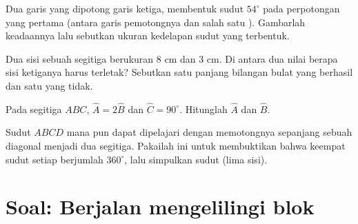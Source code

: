 \begin{exercise}[$\star\star$]\label{exo:g7:triangles:8}
Dua garis yang  dipotong garis ketiga, membentuk sudut $54^\circ$
pada perpotongan yang pertama (antara garis pemotongnya dan salah satu
). Gambarlah keadaannya lalu sebutkan ukuran kedelapan
sudut yang terbentuk.
\end{exercise}

\begin{exercise}[$\star\star$]\label{exo:g7:triangles:9}
Dua sisi sebuah segitiga berukuran $8$ cm dan $3$ cm. Di antara dua
nilai berapa sisi ketiganya harus terletak? Sebutkan satu panjang
bilangan bulat yang berhasil dan satu yang tidak.
\end{exercise}

\begin{exercise}[$\star\star$]\label{exo:g7:triangles:10}
Pada segitiga $ABC$, $\widehat A = 2\widehat B$ dan
$\widehat C = 90^\circ$. Hitunglah $\widehat A$ dan $\widehat B$.
\end{exercise}

\begin{exercise}[$\star\star\star$]\label{exo:g7:triangles:11}
Sudut  $ABCD$ mana pun dapat dipelajari dengan memotongnya
sepanjang sebuah diagonal menjadi dua segitiga. Pakailah ini untuk
membuktikan bahwa keempat sudut setiap  berjumlah
$360^\circ$, lalu simpulkan  sudut  (lima sisi).
\end{exercise}

\section{Soal: Berjalan mengelilingi blok}

